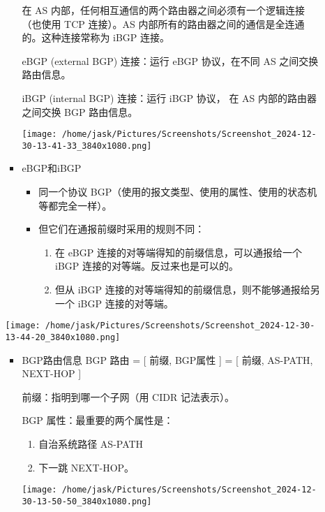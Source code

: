 \documentclass[11pt]{article}
\begin{document}
\begin{enumerate}
\begin{enumerate}
\begin{itemize}
在 AS 内部，任何相互通信的两个路由器之间必须有一个逻辑连接（也使用 TCP 连接）。AS 内部所有的路由器之间的通信是全连通的。这种连接常称为 iBGP 连接。

eBGP (external BGP) 连接：运行 eBGP 协议，在不同 AS 之间交换路由信息。

iBGP (internal BGP) 连接：运行 iBGP 协议， 在 AS 内部的路由器之间交换 BGP 路由信息。

\begin{center}
\texttt{[image: /home/jask/Pictures/Screenshots/Screenshot\_2024-12-30-13-41-33\_3840x1080.png]}
\end{center}

\item eBGP和iBGP
\begin{itemize}
\item 同一个协议 BGP（使用的报文类型、使用的属性、使用的状态机等都完全一样）。

\item 但它们在通报前缀时采用的规则不同：
\begin{enumerate}
\item 在 eBGP 连接的对等端得知的前缀信息，可以通报给一个 iBGP 连接的对等端。反过来也是可以的。

\item 但从 iBGP 连接的对等端得知的前缀信息，则不能够通报给另一个 iBGP 连接的对等端。
\end{enumerate}
\end{itemize}
\end{itemize}
\begin{center}
\texttt{[image: /home/jask/Pictures/Screenshots/Screenshot\_2024-12-30-13-44-20\_3840x1080.png]}
\end{center}

\begin{itemize}
\item BGP路由信息
BGP 路由 = [ 前缀, BGP属性 ] = [ 前缀, AS-PATH, NEXT-HOP ]

前缀：指明到哪一个子网（用 CIDR 记法表示）。

BGP 属性：最重要的两个属性是：
\begin{enumerate}
\item 自治系统路径 AS-PATH
\item 下一跳 NEXT-HOP。
\end{enumerate}

\begin{center}
\texttt{[image: /home/jask/Pictures/Screenshots/Screenshot\_2024-12-30-13-50-50\_3840x1080.png]}
\end{center}


\end{itemize}
\end{enumerate}
\end{enumerate}
\end{document}
